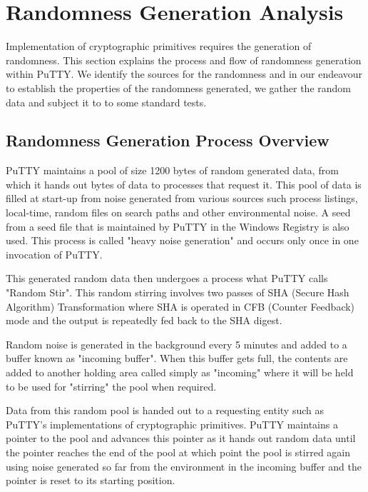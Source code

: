 \documentclass{bhamthesis}
\begin{document}
\section{Randomness Generation Analysis}
Implementation of cryptographic primitives requires the generation of randomness. This section explains the process and flow of randomness generation within PuTTY. We identify the sources for the randomness and in our endeavour to establish the properties of the randomness generated, we gather the random data and subject it to to some standard tests.
\subsection{Randomness Generation Process Overview}
PuTTY maintains a pool of size 1200 bytes of random generated data, from which it hands out bytes of data to processes that request it. This pool of data is filled at start-up from noise generated from various sources such process listings, local-time, random files on search paths and other environmental noise. A seed from a seed file that is maintained by PuTTY in the Windows Registry is also used. This process is called "heavy noise generation" and occurs only once in one invocation of PuTTY.\par
This generated random data then undergoes a process what PuTTY calls "Random Stir". This random stirring involves two passes of SHA (Secure Hash Algorithm) Transformation where SHA is operated in CFB (Counter Feedback) mode and the output is repeatedly fed back to the SHA digest.\par
Random noise is generated in the background every 5 minutes and added to a buffer known as "incoming buffer". When this buffer gets full, the contents are added to another holding area called simply as "incoming" where it will be held to be used for "stirring" the pool when required.\par
Data from this random pool is handed out to a requesting entity such as PuTTY's implementations of cryptographic primitives. PuTTY maintains a pointer to the pool and advances this pointer as it hands out random data until the pointer reaches the end of the pool at which point the pool is stirred again using noise generated so far from the environment in the incoming buffer and the pointer is reset to its starting position.\par
\end{document}

